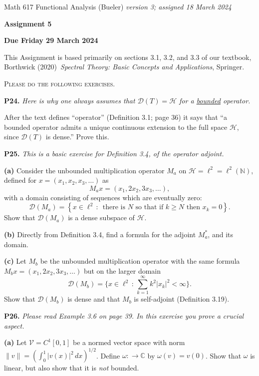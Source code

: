 \documentclass[12pt]{amsart}
\newcommand{\cD}{\mathcal{D}}
\newcommand{\cH}{\mathcal{H}}
\newcommand{\cV}{\mathcal{V}}
\newcommand{\CC}{\mathbb{C}}
\newcommand{\NN}{\mathbb{N}}
\newcommand{\prob}[1]{\bigskip\noindent\textbf{#1.}\quad }
\newcommand{\epart}[1]{\medskip\noindent\textbf{(#1)}\quad }
\begin{document}
\scriptsize \noindent Math 617 Functional Analysis (Bueler) \hfill \emph{version 3; assigned 18 March 2024}
\normalsize\medskip

\Large\centerline{\textbf{Assignment 5}}
\large
\medskip

\centerline{\textbf{Due Friday 29 March 2024}}
\medskip
\normalsize

\thispagestyle{empty}

\bigskip
\noindent This Assignment is based primarily on sections 3.1, 3.2, and 3.3 of our textbook, Borthwick (2020)~\emph{Spectral Theory: Basic Concepts and Applications}, Springer.

\medskip
\noindent \textsc{Please do the following exercises.}
\smallskip


\prob{P24}  \emph{Here is why one always assumes that $\cD(T) = \cH$ for a \underline{bounded} operator.}

\medskip \noindent After the text defines ``operator'' (Definition 3.1; page 36) it says that ``a bounded operator admits a unique continuous extension to the full space $\cH$, since $\cD(T)$ is dense.''  Prove this.


\prob{P25}  \emph{This is a basic exercise for Definition 3.4, of the operator adjoint.}

\epart{a} Consider the unbounded multiplication operator $M_a$ on $\cH=\ell^2=\ell^2(\NN)$, defined for $x=(x_1,x_2,x_3,\dots)$ as
	$$M_a x = (x_1, 2 x_2, 3 x_3, \dots),$$
with a domain consisting of sequences which are eventually zero:
	$$\cD(M_a) = \left\{x \in \ell^2\,:\,\text{ there is $N$ so that if $k\ge N$ then } x_k=0\right\}.$$
Show that $\cD(M_a)$ is a dense subspace of $\cH$.

\epart{b} Directly from Definition 3.4, find a formula for the adjoint $M_a^*$, and its domain.

\epart{c} Let $M_b$ be the unbounded multiplication operator with the same formula $M_b x = (x_1, 2 x_2, 3 x_3, \dots)$ but on the larger domain
    $$\cD(M_b) = \Big\{x \in \ell^2\,:\, \sum_{k=1}^\infty k^2 |x_k|^2 < \infty\Big\}.$$
Show that $\cD(M_b)$ is dense and that $M_b$ is self-adjoint (Definition 3.19).


\prob{P26}  \emph{Please read Example 3.6 on page 39.  In this exercise you prove a crucial aspect.}

\epart{a} Let $\cV = C^1[0,1]$ be a normed vector space with norm $\|v\| = \left(\int_0^1 |v(x)|^2\,dx\right)^{1/2}$.  Define $\omega: \to \CC$ by $\omega(v) = v(0)$.  Show that $\omega$ is linear, but also show that it is \emph{not} bounded.
\end{document}
